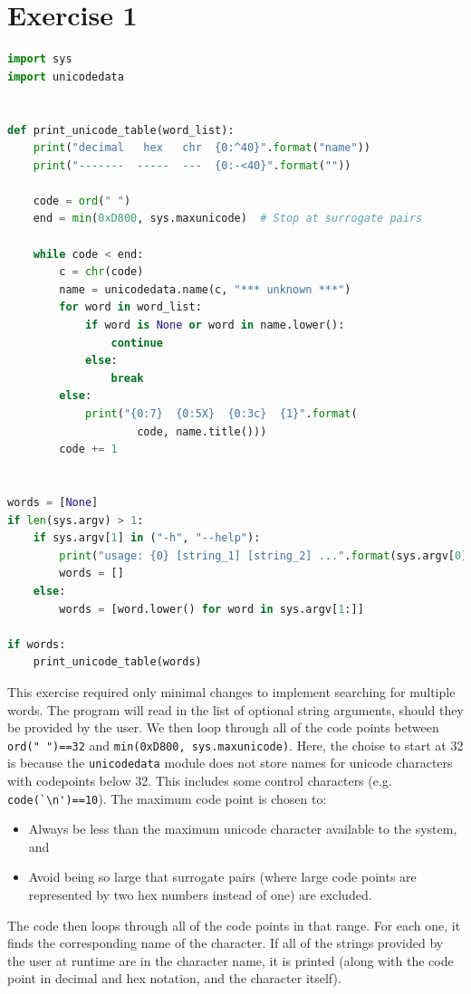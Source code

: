 \documentclass{report}
\begin{document}
\section*{Exercise 1}
\begin{lstlisting}[language=Python, style=pythonStyle]
import sys
import unicodedata


def print_unicode_table(word_list):
    print("decimal   hex   chr  {0:^40}".format("name"))
    print("-------  -----  ---  {0:-<40}".format(""))

    code = ord(" ")
    end = min(0xD800, sys.maxunicode)  # Stop at surrogate pairs

    while code < end:
        c = chr(code)
        name = unicodedata.name(c, "*** unknown ***")
        for word in word_list:
            if word is None or word in name.lower():
                continue
            else:
                break
        else:
            print("{0:7}  {0:5X}  {0:3c}  {1}".format(
                    code, name.title()))
        code += 1


words = [None]
if len(sys.argv) > 1:
    if sys.argv[1] in ("-h", "--help"):
        print("usage: {0} [string_1] [string_2] ...".format(sys.argv[0]))
        words = []
    else:
        words = [word.lower() for word in sys.argv[1:]]

if words:
    print_unicode_table(words)

\end{lstlisting}
This exercise required only minimal changes to implement searching for multiple words. The program will read in the list of optional string arguments, should they be provided by the user. We then loop through all of the code points between \verb|ord(" ")==32| and \verb|min(0xD800, sys.maxunicode)|. Here, the choise to start at 32 is because the \verb|unicodedata| module does not store names for unicode characters with codepoints below 32. This includes some control characters (e.g. \verb|code(`\n')==10|). The maximum code point is chosen to:
\begin{itemize}
\item Always be less than the maximum unicode character available to the system, and
\item Avoid being so large that surrogate pairs (where large code points are represented by two hex numbers instead of one) are excluded.
\end{itemize}
The code then loops through all of the code points in that range. For each one, it finds the corresponding name of the character. If all of the strings provided by the user at runtime are in the character name, it is printed (along with the code point in decimal and hex notation, and the character itself).
\end{document}
